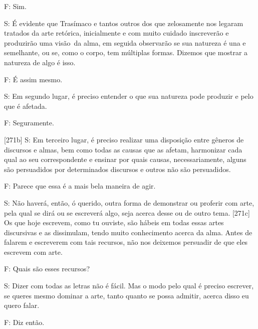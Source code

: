  

F: Sim.

 

S: É evidente que Trasímaco e tantos outros dos que zelosamente nos
legaram tratados da arte retórica, inicialmente e com muito cuidado
inscreverão e produzirão uma visão\emph{~}da alma, em seguida observarão
se sua natureza é una e semelhante, ou se, como o corpo, tem múltiplas
formas. Dizemos que mostrar a natureza de algo é isso.

 

F: É assim mesmo.

 

S: Em segundo lugar, é preciso entender o que sua natureza pode produzir
e pelo que é afetada.

 

 

F: Seguramente.

 

[271b] S: Em terceiro lugar, é preciso realizar uma disposição entre
gêneros de discursos e almas, bem como todas as causas que as afetam,
harmonizar cada qual ao seu correspondente e ensinar por quais causas,
necessariamente, alguns são persuadidos por determinados discursos e
outros não são persuadidos.

 

F: Parece que essa é a mais bela maneira de agir.

 

S: Não haverá, então, ó querido, outra forma de demonstrar ou proferir
com arte, pela qual se dirá ou se escreverá algo, seja acerca desse ou
de outro tema. [271c] Os que hoje escrevem, como tu ouviste, são
hábeis em todas essas artes discursivas e as dissimulam, tendo muito
conhecimento acerca da alma. Antes de falarem e escreverem com tais
recursos, não nos deixemos persuadir de que eles escrevem com arte.

 

F: Quais são esses recursos?

 

S: Dizer com todas as letras não é fácil. Mas o modo pelo qual é preciso
escrever, se queres mesmo dominar a arte, tanto quanto se possa admitir,
acerca disso eu quero falar.

 

F: Diz então.

 


